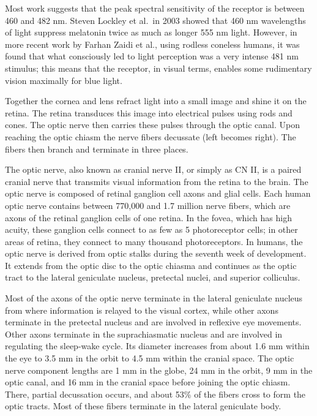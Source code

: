 Most work suggests that the peak spectral sensitivity of the receptor is between 460 and 482 nm. Steven Lockley et al.~in 2003 showed that 460 nm wavelengths of light suppress melatonin twice as much as longer 555 nm light. However, in more recent work by Farhan Zaidi et al., using rodless coneless humans, it was found that what consciously led to light perception was a very intense 481 nm stimulus; this means that the receptor, in visual terms, enables some rudimentary vision maximally for blue light.

Together the cornea and lens refract light into a small image and shine it on the retina. The retina transduces this image into electrical pulses using rods and cones. The optic nerve then carries these pulses through the optic canal. Upon reaching the optic chiasm the nerve fibers decussate (left becomes right). The fibers then branch and terminate in three places.

The optic nerve, also known as cranial nerve II, or simply as CN II, is a paired cranial nerve that transmits visual information from the retina to the brain. The optic nerve is composed of retinal ganglion cell axons and glial cells. Each human optic nerve contains between 770,000 and 1.7 million nerve fibers, which are axons of the retinal ganglion cells of one retina. In the fovea, which has high acuity, these ganglion cells connect to as few as 5 photoreceptor cells; in other areas of retina, they connect to many thousand photoreceptors.
In humans, the optic nerve is derived from optic stalks during the seventh week of development. It extends from the optic disc to the optic chiasma and continues as the optic tract to the lateral geniculate nucleus, pretectal nuclei, and superior colliculus.

Most of the axons of the optic nerve terminate in the lateral geniculate nucleus from where information is relayed to the visual cortex, while other axons terminate in the pretectal nucleus and are involved in reflexive eye movements. Other axons terminate in the suprachiasmatic nucleus and are involved in regulating the sleep-wake cycle. Its diameter increases from about 1.6 mm within the eye to 3.5 mm in the orbit to 4.5 mm within the cranial space. The optic nerve component lengths are 1 mm in the globe, 24 mm in the orbit, 9 mm in the optic canal, and 16 mm in the cranial space before joining the optic chiasm. There, partial decussation occurs, and about 53\% of the fibers cross to form the optic tracts. Most of these fibers terminate in the lateral geniculate body.

